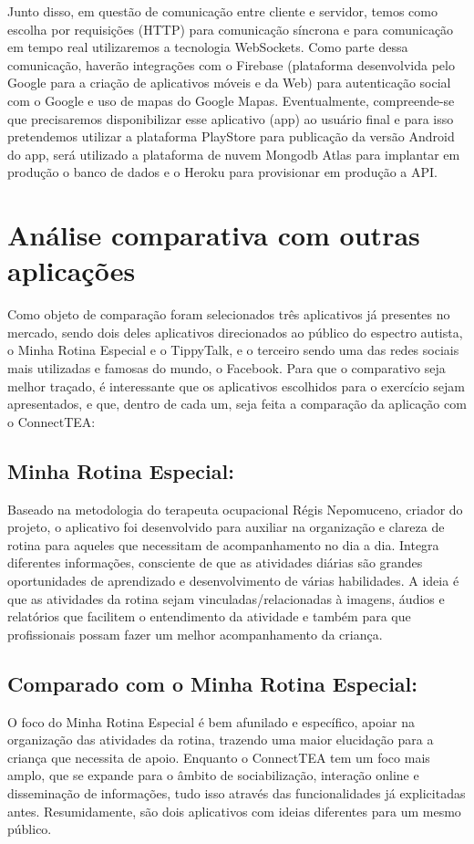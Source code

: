 \begin{apendicesenv}
	Junto disso, em questão de comunicação entre cliente e servidor, temos como escolha por requisições (HTTP) para comunicação síncrona e para comunicação em tempo real utilizaremos a tecnologia WebSockets. Como parte dessa comunicação, haverão integrações com o Firebase (plataforma desenvolvida pelo Google para a criação de aplicativos móveis e da Web) para autenticação social com o Google e uso de mapas do Google Mapas.
	Eventualmente, compreende-se que precisaremos disponibilizar esse aplicativo (app) ao usuário final e para isso pretendemos utilizar a plataforma PlayStore para publicação da versão Android do app, será utilizado a plataforma de nuvem Mongodb Atlas para implantar em produção o banco de dados e o Heroku para provisionar em produção a API.
	
	
	
	\section{Análise comparativa com outras aplicações}
	Como objeto de comparação foram selecionados três aplicativos já presentes no mercado, sendo dois deles aplicativos direcionados ao público do espectro autista, o Minha Rotina Especial e o TippyTalk, e o terceiro sendo uma das redes sociais mais utilizadas e famosas do mundo, o Facebook.
	Para que o comparativo seja melhor traçado, é interessante que os aplicativos escolhidos para o exercício sejam apresentados, e que, dentro de cada um, seja feita a comparação da aplicação com o ConnectTEA:
	
	\subsection{Minha Rotina Especial:}
	Baseado na metodologia do terapeuta ocupacional Régis Nepomuceno, criador do projeto, o aplicativo foi desenvolvido para auxiliar na organização e clareza de rotina para aqueles que necessitam de acompanhamento no dia a dia.
	Integra diferentes informações, consciente de que as atividades diárias são grandes oportunidades de aprendizado e desenvolvimento de várias habilidades.
	A ideia é que as atividades da rotina sejam vinculadas/relacionadas à imagens, áudios e relatórios que facilitem o entendimento da atividade e também para que profissionais possam fazer um melhor acompanhamento da criança.
	
	\subsection{Comparado com o Minha Rotina Especial:}
	O foco do Minha Rotina Especial é bem afunilado e específico, apoiar na organização das atividades da rotina, trazendo uma maior elucidação para a criança que necessita de apoio. Enquanto o ConnectTEA tem um foco mais amplo, que se expande para o âmbito de sociabilização, interação online e disseminação de informações, tudo isso através das funcionalidades já explicitadas antes. Resumidamente, são dois aplicativos com ideias diferentes para um mesmo público.
	

\end{apendicesenv}
